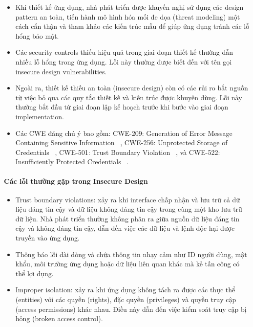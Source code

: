 \begin{itemize}
    \item Khi thiết kế ứng dụng, nhà phát triển được khuyến nghị sử dụng các design pattern an toàn, tiến hành mô hình hóa mối đe dọa (threat modeling) một cách cẩn thận và tham khảo các kiến trúc mẫu để giúp ứng dụng tránh các lỗ hổng bảo mật.
    \item Các security controls thiếu hiệu quả trong giai đoạn thiết kế thường dẫn nhiều lỗ hổng trong ứng dụng. Lỗi này thường được biết đến với tên gọi insecure design vulnerabilities.
    \item Ngoài ra, thiết kế thiếu an toàn (insecure design) còn có các rủi ro bắt nguồn từ việc bỏ qua các quy tắc thiết kế và kiến trúc được khuyên dùng. Lỗi này thường bắt đầu từ giai đoạn lập kế hoạch trước khi bước vào giai đoạn implementation.
    \item Các CWE đáng chú ý bao gồm: CWE-209: Generation of Error Message Containing Sensitive Information ~\cite{chap2bib19}, CWE-256: Unprotected Storage of Credentials ~\cite{chap2bib20}, CWE-501: Trust Boundary Violation ~\cite{chap2bib21}, và CWE-522: Insufficiently Protected Credentials ~\cite{chap2bib22}.
\end{itemize}

\paragraph{Các lỗi thường gặp trong Insecure Design ~\cite{chap2bib18}}

\begin{itemize}
    \item Trust boundary violations: xảy ra khi interface chấp nhận và lưu trữ cả dữ liệu đáng tin cậy và dữ liệu không đáng tin cậy trong cùng một kho lưu trữ dữ liệu. Nhà phát triển thường không phân ra giữa nguồn dữ liệu đáng tin cậy và không đáng tin cậy, dẫn đến việc các dữ liệu và lệnh độc hại được truyền vào ứng dụng.
    \item Thông báo lỗi dài dòng và chứa thông tin nhạy cảm như ID người dùng, mật khẩu, môi trường ứng dụng hoặc dữ liệu liên quan khác mà kẻ tấn công có thể lợi dụng.
    \item Improper isolation: xảy ra khi ứng dụng không tách ra được các thực thể (entities) với các quyền (rights), đặc quyền (privileges) và quyền truy cập (access permissions) khác nhau. Điều này dẫn đến việc kiểm soát truy cập bị hỏng (broken access control).
\end{itemize}

